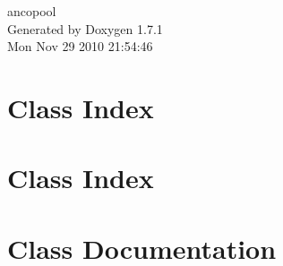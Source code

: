 \documentclass[a4paper]{book}
\begin{document}
\hypersetup{pageanchor=false}
\begin{titlepage}
\vspace*{7cm}
\begin{center}
{\Large ancopool }\\
\vspace*{1cm}
{\large Generated by Doxygen 1.7.1}\\
\vspace*{0.5cm}
{\small Mon Nov 29 2010 21:54:46}\\
\end{center}
\end{titlepage}
\clearemptydoublepage
{}
\tableofcontents
\clearemptydoublepage
{}
\hypersetup{pageanchor=true}
\chapter{Class Index}

\chapter{Class Index}

\chapter{Class Documentation}













































\printindex
\end{document}
